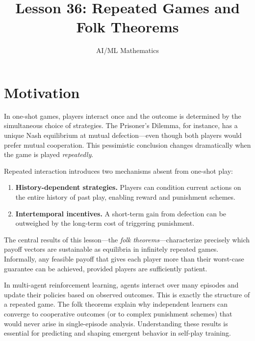 \documentclass[11pt,a4paper]{article}
\title{Lesson 36: Repeated Games and Folk Theorems}
\author{AI/ML Mathematics}
\date{}
\begin{document}
\maketitle
\tableofcontents
\newpage


\section{Motivation}
\label{sec:motivation}

In one-shot games, players interact once and the outcome is determined by
the simultaneous choice of strategies. The Prisoner's Dilemma, for
instance, has a unique Nash equilibrium at mutual defection---even though
both players would prefer mutual cooperation. This pessimistic conclusion
changes dramatically when the game is played \emph{repeatedly}.

Repeated interaction introduces two mechanisms absent from one-shot play:
\begin{enumerate}[label=(\roman*)]
    \item \textbf{History-dependent strategies.} Players can condition
    current actions on the entire history of past play, enabling reward
    and punishment schemes.
    \item \textbf{Intertemporal incentives.} A short-term gain from
    defection can be outweighed by the long-term cost of triggering
    punishment.
\end{enumerate}

The central results of this lesson---the \emph{folk theorems}---characterize
precisely which payoff vectors are sustainable as equilibria in infinitely
repeated games. Informally, any feasible payoff that gives each player
more than their worst-case guarantee can be achieved, provided players are
sufficiently patient.

\begin{rlconnection}[title={MARL Training as a Repeated Game}]
In multi-agent reinforcement learning, agents interact over many episodes
and update their policies based on observed outcomes. This is exactly the
structure of a repeated game. The folk theorems explain why independent
learners can converge to cooperative outcomes (or to complex punishment
schemes) that would never arise in single-episode analysis. Understanding
these results is essential for predicting and shaping emergent behavior in
self-play training.
\end{rlconnection}
\end{document}
